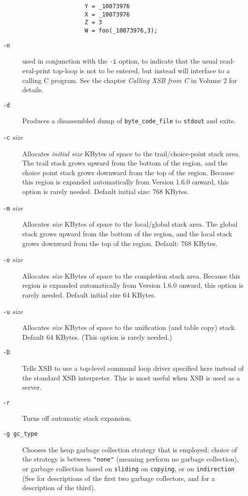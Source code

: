 \begin{description}
\begin{verbatim}
                  Y = _10073976
                  X = _10073976
                  Z = 3
                  W = foo(_10073976,3);
	\end{verbatim}
\item[{\tt -n}] used in conjunction with the {\tt -i} option, to
    indicate that the usual read-eval-print top-loop is not to be
    entered, but instead will interface to a calling C program.  See
    the chapter {\it Calling XSB from C} in Volume 2  for details.
\item[{\tt -d}] Produces a disassembled dump of {\tt byte\_code\_file} to 
    {\tt stdout} and exits.
\item[{\tt -c} {\em size}] Allocates {\em initial  size\/} KBytes of space
    to the trail/choice-point stack area.  The trail stack grows
    upward from the bottom of the region, and the choice point stack
    grows downward from the top of the region.  Because this region is
    expanded automatically from Version 1.6.0 onward, this option
    is rarely needed.  Default initial size: 768 KBytes.
\item[{\tt -m} {\em size}] Allocates {\em size\/} KBytes
    of space to the local/global stack area.  The global stack grows 
    upward from the bottom of the region, and the local stack grows 
    downward from the top of the region.  Default: 768 KBytes.
\item[{\tt -o} {\em size}] Allocates {\em size\/} KBytes of space
    to the completion stack area.  Because this region is expanded
    automatically from Version 1.6.0 onward, this option is rarely
    needed. Default initial size 64 KBytes.
\item[{\tt -u} {\em size}] Allocates {\em size} KBytes of space
    to the unification (and table copy) stack.  Default 64 KBytes.
    (This option is rarely needed.)
\item[{\tt -D}] Tells XSB to use a top-level command loop driver specified
  here instead of the standard XSB interpreter. This is most useful when
  XSB is used as a server.
\item[{\tt -r}] Turns off automatic stack expansion.
%
\item[{\tt -g gc\_type}] Chooses the heap garbage collection strategy
  that is employed; choice of the strategy is between {\tt "none"}
  (meaning perform no garbage collection), or garbage collection based
  on {\tt sliding} on {\tt copying}, or on {\tt indirection} (See
  \cite{CATmem@ISMM-98} for descriptions of the first two garbage
  collectors, and \cite{CaSC01} for a description of the third).

\end{description}
